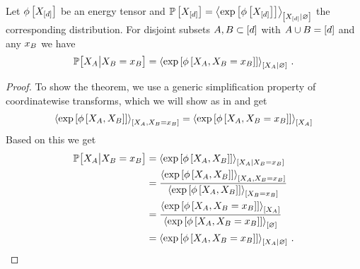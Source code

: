 \begin{theorem}
    \label{the:energyContractionQueries} %
    Let $\phi\left[X_{[d]}\right]$ be an energy tensor and $\mathbb{P}\left[X_{[d]}\right]=\left\langle \mathrm{exp}\left[\phi\left[X_{[d]}\right]\right]\right\rangle_{\left[ X_{[d]} | \varnothing \right]}$ the corresponding distribution.
    For disjoint subsets $A,B \subset [d]$ with $A\cup B=[d]$ and any $x_{B}$ we have
    \begin{align*}
        \mathbb{P}\big[X_{A}\big|X_{B}=x_{B}\big]
        = \left\langle 
            \mathrm{exp}\left[\phi\left[X_{A},X_{B}=x_{B}\right]\right]
        \right\rangle_{\left[ X_{A} | \varnothing \right]} \, .
    \end{align*}
\end{theorem}
\begin{proof}
    To show the theorem, we use a generic simplification property of coordinatewise transforms, which we will show as  in  and get
    \begin{align*}
        \left\langle \mathrm{exp}\left[\phi\left[X_{A},X_{B}\right]\right]\right\rangle_{\left[ X_{A},X_{B}=x_{B} \right]}
        = \left\langle \mathrm{exp}\left[\phi\left[X_{A},X_{B}=x_{B}\right]\right]\right\rangle_{\left[ X_{A} \right]}
    \end{align*}
    Based on this we get
    \begin{align*}
        \mathbb{P}\big[X_{A}\big|X_{B}=x_{B}\big]
        &= \left\langle \mathrm{exp}\left[\phi\left[X_{A},X_{B}\right]\right]\right\rangle_{\left[ X_{A} | X_{B}=x_{B} \right]} \\
        &= \frac{\left\langle \mathrm{exp}\left[\phi\left[X_{A},X_{B}\right]\right]\right\rangle_{\left[ X_{A},X_{B}=x_{B} \right]}}{
            \left\langle \mathrm{exp}\left[\phi\left[X_{A},X_{B}\right]\right]\right\rangle_{\left[ X_{B}=x_{B} \right]}
        } \\
        &= \frac{\left\langle \mathrm{exp}\left[\phi\left[X_{A},X_{B}=x_{B}\right]\right]\right\rangle_{\left[ X_{A} \right]}}{
            \left\langle \mathrm{exp}\left[\phi\left[X_{A},X_{B}=x_{B}\right]\right]\right\rangle_{\left[ \varnothing \right]}
        } \\
        &= \left\langle 
            \mathrm{exp}\left[\phi\left[X_{A},X_{B}=x_{B}\right]\right]
        \right\rangle_{\left[ X_{A} | \varnothing \right]} \, . \qedhere
    \end{align*}
\end{proof}

